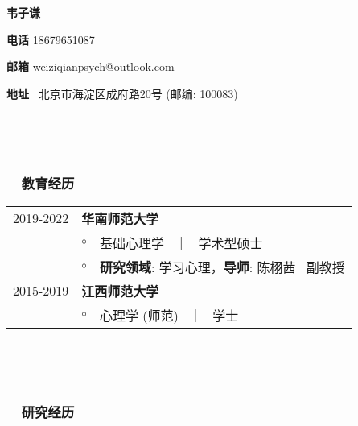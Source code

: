 \documentclass[a4paper, 12pt]{ctexart}
\begin{document}
{}

\centerline{\large\bf 韦子谦}
\centerline{\textbf{电话} 18679651087}
\centerline{\textbf{邮箱} \href{mailto: weiziqianpsych@outlook.com}{weiziqianpsych@outlook.com}}
\centerline{\textbf{地址} \ 北京市海淀区成府路20号 (邮编: 100083)}

\  \par 
\  \par 

\subsubsection*{ \ \ 教育经历}


\begin{tabularx}{\textwidth}{p{2cm} p{0.1cm} X}

    2019-2022 & \multicolumn{2}{X}{\textbf{华南师范大学}} \\
    & $\circ$ & 基础心理学 \ ｜ \ 学术型硕士 \\
    & $\circ$ & \textbf{研究领域}: 学习心理，\textbf{导师}: 陈栩茜 \ 副教授  \\

    2015-2019 & \multicolumn{2}{X}{\textbf{江西师范大学}} \\
    & $\circ$ & 心理学 (师范) \ ｜ \ 学士 \\
    
    \end{tabularx}



\  \par 
\  \par 


\subsubsection*{ \ \ 研究经历}
\end{document}
